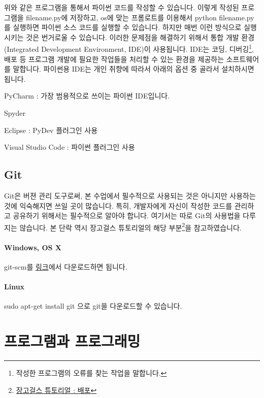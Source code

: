 \documentclass[twoside]{article}
\begin{document}
위와 같은 프로그램을 통해서 파이썬 코드를 작성할 수 있습니다. 이렇게 작성된 프로그램을 filename.py에 저장하고, os에 맞는 프롬로트를 이용해서 python filename.py를 실행하면 파이썬 소스 코드를 실행할 수 있습니다. 하지만 매번 이런 방식으로 실행시키는 것은 번거로울 수 있습니다. 이러한 문제점을 해결하기 위해서 통합 개발 환경(Integrated Development Environment, IDE)이 사용됩니다. IDE는 코딩, 디버깅\footnote{작성한 프로그램의 오류를 찾는 작업을 말합니다.}, 배포 등 프로그램 개발에 필요한 작업들을 처리할 수 있는 환경을 제공하는 소프트웨어를 말합니다. 파이썬용 IDE는 개인 취향에 따라서 아래의 옵션 중 골라서 설치하시면 됩니다. 

\begin{compactitem} 
\item PyCharm : 가장 범용적으로 쓰이는 파이썬 IDE입니다. 
\item Spyder 
\item Eclipse : PyDev 플러그인 사용 
\item Visual Studio Code : 파이썬 플러그인 사용
\end{compactitem} 

\subsection{Git}

Git은 버젼 관리 도구로써, 본 수업에서 필수적으로 사용되는 것은 아니지만 사용하는 것에 익숙해지면 쓰일 곳이 많습니다. 특히, 개발자에게 자신이 작성한 코드를 관리하고 공유하기 위해서는 필수적으로 알아야 합니다. 여기서는 따로 Git의 사용법을 다루지는 않습니다. 본 단락 역시 장고걸스 튜토리얼의 해당 부분\footnote{\href{https://tutorial.djangogirls.org/ko/deploy/}{장고걸스 튜토리얼 : 배포}}을 참고하였습니다. 

\paragraph{Windows, OS X} 

git-scm를 \href{git-scm.com}{링크}에서 다운로드하면 됩니다. 

\paragraph{Linux} 

sudo apt-get install git 으로 git을 다운로드할 수 있습니다. 


\section{프로그램과 프로그래밍} 
\end{document}
